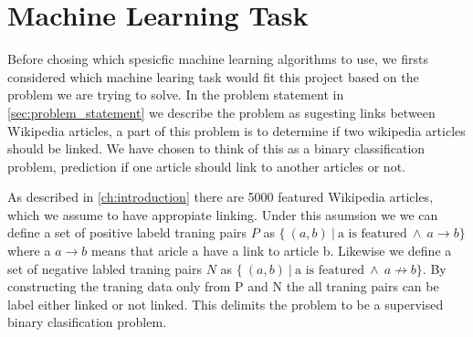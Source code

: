 

\section{Machine Learning Task}
Before chosing which spesicfic machine learning algorithms to use, we firsts considered which machine learing task would fit this project based on the problem we are trying to solve. In the problem statement in \cref{sec:problem_statement} we describe the problem as sugesting links between Wikipedia articles, a part of this problem is to determine if two wikipedia articles should be linked. We have chosen to think of this as a binary classification problem, prediction if one article should link to another articles or not.

As described in \cref{ch:introduction} there are 5000 featured Wikipedia articles, which we assume to have appropiate linking. Under this asumsion we we can define a set of positive labeld traning pairs $P$ as $\{\ (a,b)\ |\ \text{a is featured}\ \wedge\ a \to b \}$ where a $a \to b$ means that aricle a have a link to article b. Likewise we define a set of negative labled traning pairs $N$ as  $\{\ (a,b)\ |\ \text{a is featured}\ \wedge\ a \not\to b \}$.
By constructing the traning data only from P and N the all traning pairs can be label either linked or not linked. This delimits the problem to be a supervised binary clasification problem. 
